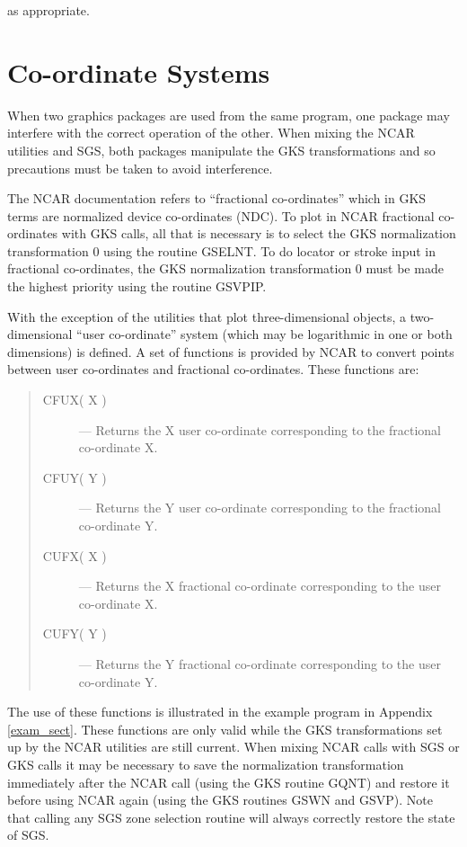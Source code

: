 \documentclass[twoside,11pt,nolof,noabs]{starlink}
\begin{document}
as appropriate.


\section{Co-ordinate Systems}
\label{co-ord_sect}

When two graphics packages are used from the same program, one package may
interfere with the correct operation of the other. 
When mixing the NCAR
utilities and SGS, both packages manipulate the GKS transformations and
so precautions must be taken to avoid interference.

The NCAR documentation refers to ``fractional co-ordinates'' which in
GKS terms are normalized device co-ordinates (NDC). 
To plot in NCAR fractional co-ordinates with GKS calls, all that is 
necessary is to select the GKS normalization transformation 0 using the 
routine GSELNT. 
To do locator or stroke input in fractional co-ordinates, the GKS normalization 
transformation 0 must be made the highest priority using the routine 
GSVPIP.

With the exception of the utilities that plot three-dimensional objects, a 
two-dimensional ``user co-ordinate'' system (which may be logarithmic in one or
both dimensions) is defined. 
A set of functions is provided by NCAR to convert points between user
co-ordinates and fractional co-ordinates.
These functions are:

\begin{quote}
\begin{description}
\item [CFUX( X )] ---
 Returns the X user co-ordinate corresponding to the fractional co-ordinate X.
\item [CFUY( Y )] ---
 Returns the Y user co-ordinate corresponding to the fractional co-ordinate Y.
\item [CUFX( X )] ---
 Returns the X fractional co-ordinate corresponding to the user co-ordinate X.
\item [CUFY( Y )] ---
 Returns the Y fractional co-ordinate corresponding to the user co-ordinate Y.
\end{description}
\end{quote}

The use of these functions is illustrated in the example program in Appendix 
\ref{exam_sect}.
These functions are only valid while the GKS transformations set up by the NCAR
utilities are still current.
When mixing NCAR calls with SGS or GKS calls it may be necessary to save the
normalization transformation immediately after the NCAR call (using the GKS
routine GQNT) and restore it before using NCAR again (using the GKS routines 
GSWN and GSVP).
Note that calling any SGS zone selection routine will always correctly restore
the state of SGS.
\end{document}

